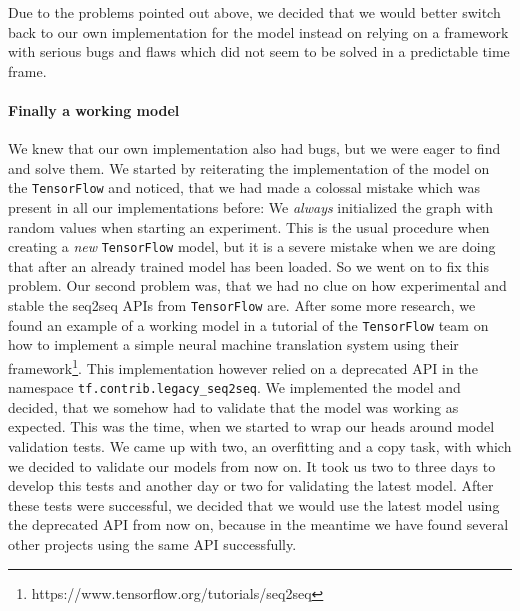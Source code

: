 Due to the problems pointed out above, we decided that we would better switch back to our own implementation for the model instead on relying on a framework with serious bugs and flaws which did not seem to be solved in a predictable time frame.

\paragraph{Finally a working model} We knew that our own implementation also had bugs, but we were eager to find and solve them. We started by reiterating the implementation of the model on the \texttt{TensorFlow} and noticed, that we had made a colossal mistake which was present in all our implementations before: We \emph{always} initialized the graph with random values when starting an experiment. This is the usual procedure when creating a \emph{new} \texttt{TensorFlow} model, but it is a severe mistake when we are doing that after an already trained model has been loaded. So we went on to fix this problem. Our second problem was, that we had no clue on how experimental and stable the seq2seq APIs from \texttt{TensorFlow} are. After some more research, we found an example of a working model in a tutorial of the \texttt{TensorFlow} team on how to implement a simple neural machine translation system using their framework\footnote{https://www.tensorflow.org/tutorials/seq2seq}. This implementation however relied on a deprecated API in the namespace \texttt{tf.contrib.legacy\_seq2seq}. We implemented the model and decided, that we somehow had to validate that the model was working as expected. This was the time, when we started to wrap our heads around model validation tests. We came up with two, an overfitting and a copy task, with which we decided to validate our models from now on. It took us two to three days to develop this tests and another day or two for validating the latest model. After these tests were successful, we decided that we would use the latest model using the deprecated API from now on, because in the meantime we have found several other projects using the same API successfully.

